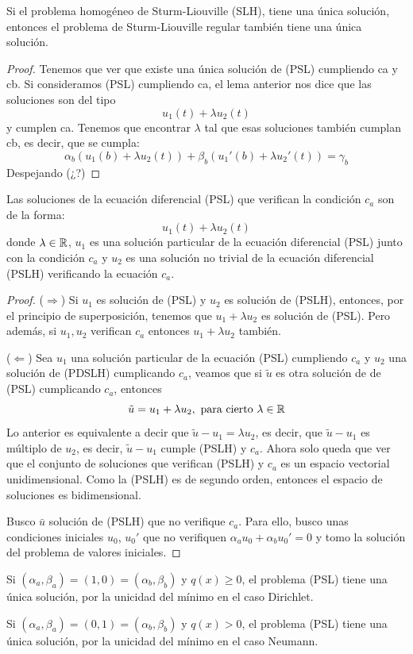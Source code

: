 \begin{theorem}
Si el problema homogéneo de Sturm-Liouville (SLH), tiene una única solución, entonces el problema de Sturm-Liouville regular también tiene una única solución.
\end{theorem}
\begin{proof}
Tenemos que ver que existe una única solución de (PSL) cumpliendo ca y cb. Si consideramos (PSL) cumpliendo ca, el lema anterior nos dice que las soluciones son del tipo 
\[
u_1(t)+\lambda u_2(t)
\]
y cumplen ca. Tenemos que encontrar $\lambda$ tal que esas soluciones también cumplan cb, es decir, que se cumpla:
\[
\alpha_b(u_1(b)+\lambda u_2(t))+\beta_b(u_1'(b)+\lambda u_2'(t))=\gamma_b
\]
Despejando (¿?)
\end{proof}

\begin{lemma}
Las soluciones de la ecuación diferencial (PSL) que verifican la condición $c_a$ son de la forma:
\[
u_1(t)+\lambda u_2(t)
\]
donde $\lambda\in\mathbb{R}$, $u_1$ es una solución particular de la ecuación diferencial (PSL) junto con la condición $c_a$ y $u_2$ es una solución no trivial de la ecuación diferencial (PSLH) verificando la ecuación $c_a$.
\end{lemma}
\begin{proof}
($\Rightarrow$) Si $u_1$ es solución de (PSL) y $u_2$ es solución de (PSLH), entonces, por el principio de superposición, tenemos que $u_1+\lambda u_2$ es solución de (PSL).
Pero además, si $u_1,u_2$ verifican $c_a$ entonces $u_1+\lambda u_2$ también.

($\Leftarrow$) Sea $u_1$ una solución particular de la ecuación (PSL) cumpliendo $c_a$ y $u_2$ una solución de (PDSLH) cumplicando $c_a$, veamos que si $\tilde{u}$ es otra solución de de (PSL) cumplicando $c_a$, entonces 
\[
\tilde{u}=u_1+\lambda u_2, \text{ para cierto } \lambda\in\mathbb{R}
\]
Lo anterior es equivalente a decir que $\tilde{u}-u_1=\lambda u_2$, es decir, que $\tilde{u}-u_1$ es múltiplo de $u_2$, es decir, $\tilde{u}-u_1$ cumple (PSLH) y $c_a$. Ahora solo queda que ver que el conjunto de soluciones que verifican (PSLH) y $c_a$ es un espacio vectorial unidimensional. Como la (PSLH) es de segundo orden, entonces el espacio de soluciones es bidimensional.

Busco $\bar{u}$ solución de (PSLH) que no verifique $c_a$. Para ello, busco unas condiciones iniciales $u_0$, $u_0'$ que no verifiquen $\alpha_a u_0+\alpha_b u_0'=0$ y tomo la solución del problema de valores iniciales.
\end{proof}

\begin{coro}
Si $(\alpha_a,\beta_a)=(1,0)=(\alpha_b,\beta_b)$ y $q(x)\geq 0$, el problema (PSL) tiene una única solución, por la unicidad del mínimo en el caso Dirichlet.
\end{coro}
\begin{coro}
Si $(\alpha_a,\beta_a)=(0,1)=(\alpha_b,\beta_b)$ y $q(x)>0$, el problema (PSL) tiene una única solución, por la unicidad del mínimo en el caso Neumann.
\end{coro}